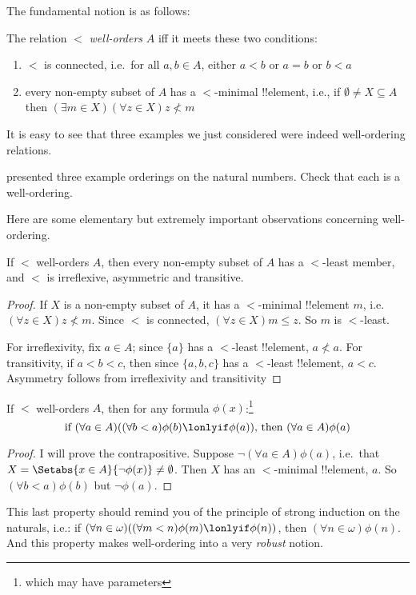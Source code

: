 \documentclass[../../../include/open-logic-section]{subfiles}
\begin{document}
The fundamental notion is as follows:
\begin{defn}
	The relation $<$ \emph{well-orders} $A$ iff it meets these two conditions:
	\begin{enumerate}
		\item $<$ is connected, i.e.\ for all $a, b \in A$, either $a < b$ or $a = b$ or $b < a$ 
		\item every non-empty subset of $A$ has a $<$-minimal !!{element}, i.e., if $\emptyset \neq X \subseteq A$ then $(\exists m \in X)(\forall z \in X)z \nless m$
	\end{enumerate}
\end{defn}\noindent
It is easy to see that three examples we just considered were indeed well-ordering relations. 
\begin{prob}
	 presented three example orderings on the natural numbers. Check that each is a well-ordering.
\end{prob}\noindent 
Here are some elementary but extremely important observations concerning well-ordering.
\begin{prop}
	If $<$ well-orders $A$, then every non-empty subset of $A$ has a $<$-least member, and $<$ is irreflexive, asymmetric and transitive.
\end{prop}
\begin{proof}
	If $X$ is a non-empty subset of $A$, it has a $<$-minimal !!{element} $m$, i.e.\ $(\forall z \in X)z \nless m$. Since $<$ is connected, $(\forall z \in X)m \leq z$. So $m$ is $<$-least.
	
	For irreflexivity, fix $a \in A$; since $\{a\}$ has a $<$-least !!{element}, $a \nless a$. For transitivity, if $a < b < c$, then since $\{a, b, c\}$ has a $<$-least !!{element}, $a < c$. Asymmetry follows from irreflexivity and transitivity
\end{proof}
\begin{prop}
	If $<$ well-orders $A$, then for any formula $\phi(x)$:\footnote{which may have parameters} 
	$$\text{if }(\forall a \in A)((\forall b < a)\phi(b) \lonlyif \phi(a))\text{, then }(\forall a \in A)\phi(a)$$
\end{prop}
\begin{proof}
	I will prove the contrapositive. Suppose $\lnot(\forall a \in A)\phi(a)$, i.e.\ that $X = \Setabs{x \in A}{\lnot\phi(x)} \neq \emptyset$. Then $X$ has an $<$-minimal !!{element}, $a$. So $(\forall b < a)\phi(b)$ but $\lnot \phi(a)$. 
\end{proof}\noindent
This last property should remind you of the principle of strong induction on the naturals, i.e.: if $(\forall n \in \omega)((\forall m < n)\phi(m) \lonlyif \phi(n))$, then $(\forall n \in \omega)\phi(n)$. And this property makes well-ordering into a very \emph{robust} notion. 
\end{document}
